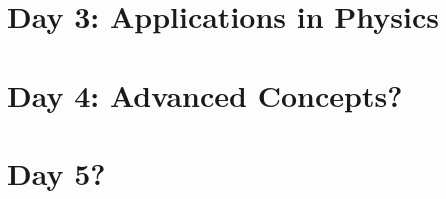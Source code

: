 \documentclass[10pt]{article}
\begin{document}
\section*{Day 3: Applications in Physics}

\section*{Day 4: Advanced Concepts?}

\section*{Day 5?}

%
\end{document}
